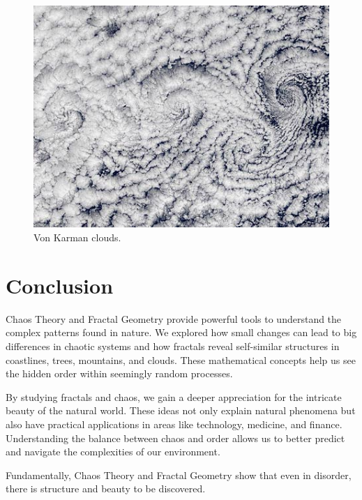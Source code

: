 \documentclass[12pt]{article}
\begin{document}
\begin{figure}[H]
\centering
\includegraphics[width=\textwidth]{assets/vonkarman-clouds.jpg}
\caption{Von Karman clouds.}
\label{fig:vonkarman-clouds}
\end{figure}

\newpage

\section{Conclusion}
Chaos Theory and Fractal Geometry provide powerful tools to understand the complex patterns found in nature. We explored how small changes can lead to big differences in chaotic systems and how fractals reveal self-similar structures in coastlines, trees, mountains, and clouds. These mathematical concepts help us see the hidden order within seemingly random processes.

By studying fractals and chaos, we gain a deeper appreciation for the intricate beauty of the natural world. These ideas not only explain natural phenomena but also have practical applications in areas like technology, medicine, and finance. Understanding the balance between chaos and order allows us to better predict and navigate the complexities of our environment.

Fundamentally, Chaos Theory and Fractal Geometry show that even in disorder, there is structure and beauty to be discovered.

\newpage

\nocite{*} 
 

\end{document}
